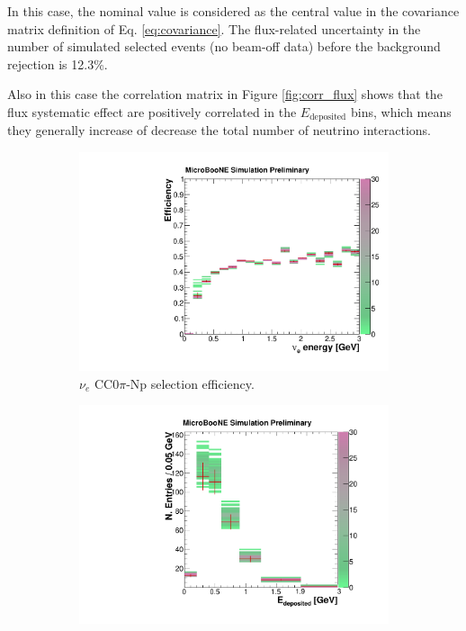 In this case, the nominal value is considered as the central value in the covariance matrix definition of Eq. \ref{eq:covariance}.
The flux-related uncertainty in the number of simulated selected events (no beam-off data) before the background rejection is 12.3\%.

Also in this case the correlation matrix in Figure \ref{fig:corr_flux} shows that the flux systematic effect are positively correlated in the $E_{\mathrm{deposited}}$ bins, which means they generally increase of decrease the total number of neutrino interactions. 

\begin{figure}[htbp]
  \begin{center}
    \begin{subfigure}{0.49\textwidth}
      \includegraphics[width=\linewidth]{figures/eff_ene_flux.pdf}
      \caption{$\nu_{e}$ CC0$\pi$-Np selection efficiency.}  \label{fig:eff_flux}
    \end{subfigure}\hfill
    \begin{subfigure}{0.49\textwidth}
      \vspace{0.5em}
      \includegraphics[width=\linewidth]{figures/reco_flux.pdf}

\end{subfigure}
\end{center}
\end{figure}
